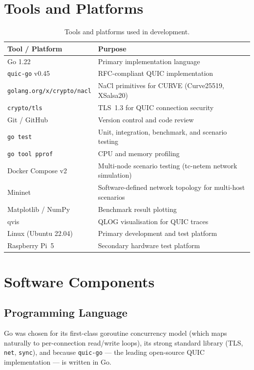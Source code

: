 \documentclass[12pt, a4paper, oneside]{report}
\begin{document}
\section{Tools and Platforms}
\label{sec:tools}

\begin{table}[H]
  \centering
  \caption{Tools and platforms used in development.}
  \label{tab:tools}
  \begin{tabularx}{\textwidth}{lX}
    \toprule
    \textbf{Tool / Platform} & \textbf{Purpose} \\
    \midrule
    Go 1.22                    & Primary implementation language \\
    \texttt{quic-go} v0.45     & RFC-compliant QUIC implementation \\
    \texttt{golang.org/x/crypto/nacl} & NaCl primitives for CURVE (Curve25519, XSalsa20) \\
    \texttt{crypto/tls}        & TLS~1.3 for QUIC connection security \\
    Git / GitHub               & Version control and code review \\
    \texttt{go test}           & Unit, integration, benchmark, and scenario testing \\
    \texttt{go tool pprof}     & CPU and memory profiling \\
    Docker Compose v2          & Multi-node scenario testing (tc-netem network simulation) \\
    Mininet                    & Software-defined network topology for multi-host scenarios \\
    Matplotlib / NumPy         & Benchmark result plotting \\
    qvis                       & QLOG visualisation for QUIC traces \\
    Linux (Ubuntu 22.04)       & Primary development and test platform \\
    Raspberry Pi~5             & Secondary hardware test platform \\
    \bottomrule
  \end{tabularx}
\end{table}

\section{Software Components}
\label{sec:sw-components}

\subsection{Programming Language}
Go was chosen for its first-class goroutine concurrency model (which maps naturally to per-connection read/write loops), its strong standard library (TLS, \texttt{net}, \texttt{sync}), and because \texttt{quic-go} — the leading open-source QUIC implementation — is written in Go.
\end{document}
